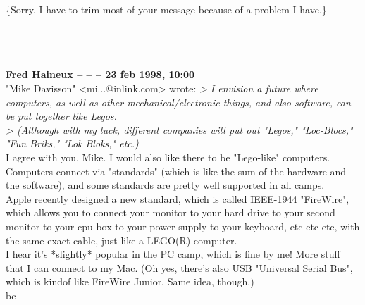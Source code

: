 \documentclass[11pt,twoside,a4paper]{article}
\begin{document}
\begin{multicols*}{2}
\{Sorry, I have to trim most of your message because of a problem I have.\}

 
		
	
		
~\\ ~\\ ~\\ \textbf{Fred Haineux -- -- -- 23 feb 1998, 10:00}~\\

"Mike Davisson" <mi...@inlink.com> wrote:
\emph{> I envision a future where computers, as well as other mechanical/electronic things, and also software, can be put together like Legos.}~\\ 
\emph{> (Although with my luck, different companies will put out "Legos," "Loc-Blocs," "Fun Briks," "Lok Bloks," etc.)}~\\

I agree with you, Mike. I would also like there to be "Lego-like" computers. Computers connect via "standards" (which is like the sum of the hardware and the software), and some standards are pretty well supported in all camps.~\\

Apple recently designed a new standard, which is called IEEE-1944 "FireWire", which allows you to connect your monitor to your hard drive to your second monitor to your cpu box to your power supply to your keyboard, etc etc etc, with the same exact cable, just like a LEGO(R) computer.~\\

I hear it's *slightly* popular in the PC camp, which is fine by me! More stuff that I can connect to my Mac. (Oh yes, there's also USB "Universal Serial Bus", which is kindof like FireWire Junior. Same idea, though.)~\\

bc 

\end{multicols*}
\end{document}
